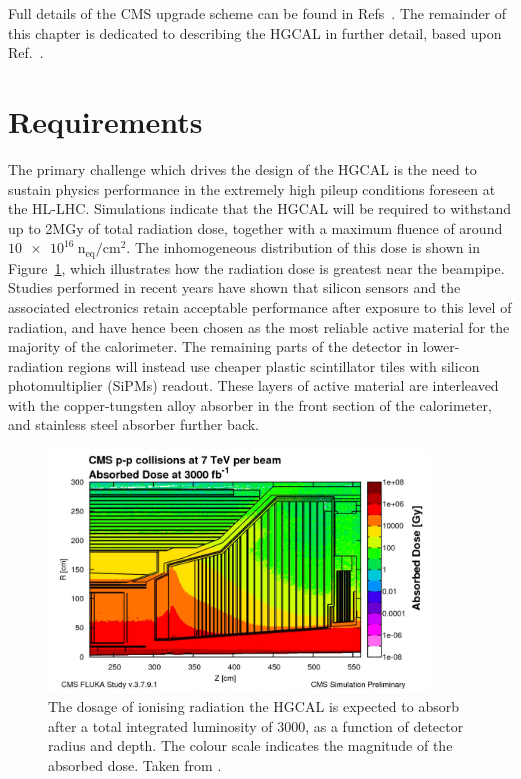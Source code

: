 Full details of the CMS upgrade scheme can be found in Refs~\cite{Tracker_Phase2TDR,Barrel_Phase2TDR,Muon_Phase2TDR,Trigger_Phase2TDR,DAQ_Phase2TDR,MTD,HGCAL}.
The remainder of this chapter is dedicated to describing the HGCAL in further detail, based upon Ref.~\cite{HGCAL}.

\section{Requirements}

The primary challenge which drives the design of the HGCAL is the need to sustain physics performance in the extremely high pileup conditions foreseen at the HL-LHC.
Simulations indicate that the HGCAL will be required to withstand up to 2MGy of total radiation dose, together with a maximum fluence of around $\SI{10e16}{\textrm{n}_{\textrm{eq}}/\textrm{cm}^2}.$
The inhomogeneous distribution of this dose is shown in Figure~\ref{fig:hgcal_Dose}, 
which illustrates how the radiation dose is greatest near the beampipe.
Studies performed in recent years have shown that silicon sensors and the associated electronics retain acceptable performance after exposure to this level of radiation, 
and have hence been chosen as the most reliable active material for the majority of the calorimeter.
The remaining parts of the detector in lower-radiation regions will instead use cheaper plastic scintillator tiles with silicon photomultiplier (SiPMs) readout.
These layers of active material are interleaved with the copper-tungsten alloy absorber in the front section of the calorimeter, 
and stainless steel absorber further back.

\begin{figure}[h!]
  \centering
  \includegraphics[width=0.9\textwidth]{Figures/HGCAL/Dose.png}
  \caption[Expected radiation dose for the HGCAL.]
  {
    The dosage of ionising radiation the HGCAL is expected to absorb 
    after a total integrated luminosity of \SI{3000}{\fbinv}, 
    as a function of detector radius and depth.
    The colour scale indicates the magnitude of the absorbed dose.
    Taken from \cite{HGCAL}.
  }
  \label{fig:hgcal_Dose}
\end{figure}

